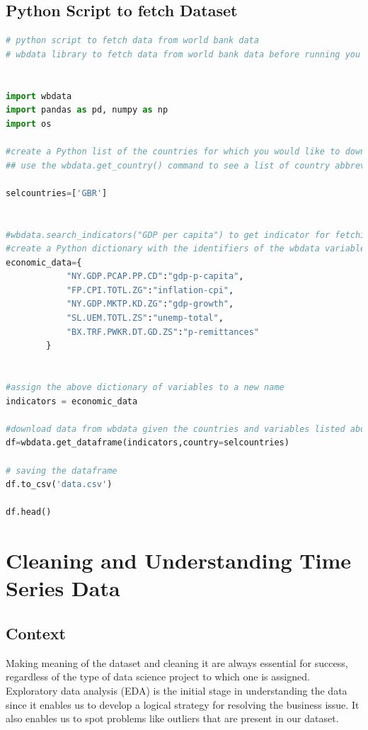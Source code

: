 \subsection{Python Script to fetch Dataset}
\begin{lstlisting}[language=Python]
# python script to fetch data from world bank data
# wbdata library to fetch data from world bank data before running you need to install in wbdata, pandas,numpy 


import wbdata
import pandas as pd, numpy as np
import os

#create a Python list of the countries for which you would like to download data.
## use the wbdata.get_country() command to see a list of country abbreviations for the wbdata dataset

selcountries=['GBR']


#wbdata.search_indicators("GDP per capita") to get indicator for fetching data from worldbank data
#create a Python dictionary with the identifiers of the wbdata variables you would like to use, assigning to each a more common-sense name for each variable
economic_data={
            "NY.GDP.PCAP.PP.CD":"gdp-p-capita", 
            "FP.CPI.TOTL.ZG":"inflation-cpi",
            "NY.GDP.MKTP.KD.ZG":"gdp-growth",
            "SL.UEM.TOTL.ZS":"unemp-total",
            "BX.TRF.PWKR.DT.GD.ZS":"p-remittances"
        }


#assign the above dictionary of variables to a new name
indicators = economic_data

#download data from wbdata given the countries and variables listed above
df=wbdata.get_dataframe(indicators,country=selcountries)

# saving the dataframe
df.to_csv('data.csv')

df.head()

\end{lstlisting}


\section{Cleaning and Understanding Time Series Data}

\subsection{Context}

\hspace{10mm}Making meaning of the dataset and cleaning it are always essential for success, regardless of the type of data science project to which one is assigned. Exploratory data analysis (EDA) is the initial stage in understanding the data since it enables us to develop a logical strategy for resolving the business issue. It also enables us to spot problems like outliers that are present in our dataset.

